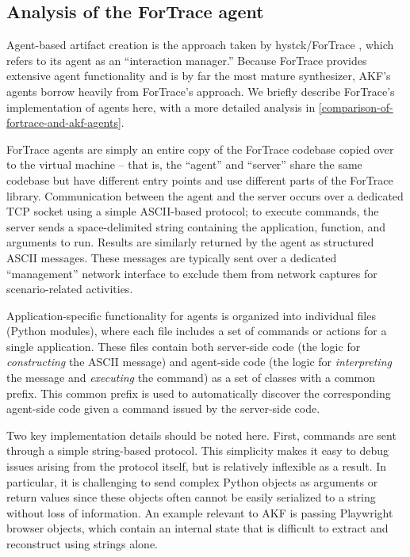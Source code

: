 \documentclass[letterpaper,12pt]{report}
\begin{document}
\subsection{Analysis of the ForTrace
agent}\label{analysis-of-the-fortrace-agent}

Agent-based artifact creation is the approach taken by hystck/ForTrace
\cite{gobelNovelApproachGenerating2020,gobelForTraceHolisticForensic2022},
which refers to its agent as an ``interaction manager.'' Because
ForTrace provides extensive agent functionality and is by far the most
mature synthesizer, AKF's agents borrow heavily from ForTrace's
approach. We briefly describe ForTrace's implementation of agents here,
with a more detailed analysis in \autoref{comparison-of-fortrace-and-akf-agents}.

ForTrace agents are simply an entire copy of the ForTrace codebase
copied over to the virtual machine -- that is, the ``agent'' and
``server'' share the same codebase but have different entry points and
use different parts of the ForTrace library. Communication between the
agent and the server occurs over a dedicated TCP socket using a simple
ASCII-based protocol; to execute commands, the server sends a
space-delimited string containing the application, function, and
arguments to run. Results are similarly returned by the agent as
structured ASCII messages. These messages are typically sent over a
dedicated ``management'' network interface to exclude them from network
captures for scenario-related activities.

Application-specific functionality for agents is organized into
individual files (Python modules), where each file includes a set of
commands or actions for a single application. These files contain both
server-side code (the logic for \emph{constructing} the ASCII message)
and agent-side code (the logic for \emph{interpreting} the message and
\emph{executing} the command) as a set of classes with a common prefix.
This common prefix is used to automatically discover the corresponding
agent-side code given a command issued by the server-side code.

Two key implementation details should be noted here. First, commands are
sent through a simple string-based protocol. This simplicity makes it
easy to debug issues arising from the protocol itself, but is relatively
inflexible as a result. In particular, it is challenging to send complex
Python objects as arguments or return values since these objects often
cannot be easily serialized to a string without loss of information. An
example relevant to AKF is passing Playwright browser objects, which
contain an internal state that is difficult to extract and reconstruct
using strings alone.
\end{document}
